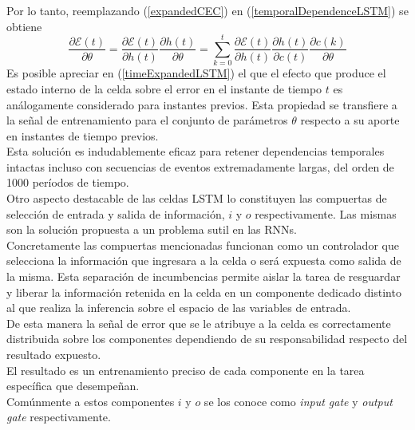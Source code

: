 \documentclass{article}
\begin{document}
	Por lo tanto, reemplazando (\ref{expandedCEC}) en (\ref{temporalDependenceLSTM}) se obtiene
	\begin{equation}\label{timeExpandedLSTM}
	\dfrac{\partial \mathcal{E}(t)}{\partial \theta} = \dfrac{\partial \mathcal{E}(t)}{\partial h(t)} \dfrac{\partial h(t)}{\partial \theta}=\sum_{k=0}^{t} \dfrac{\partial \mathcal{E}(t)}{\partial h(t)} \dfrac{\partial h(t)}{\partial c(t)}\dfrac{\partial c(k)}{\partial \theta}
	\end{equation}
	Es posible apreciar en (\ref{timeExpandedLSTM}) el que el efecto que produce el estado interno de la celda sobre el error en el instante de tiempo $t$ es análogamente considerado para instantes previos. Esta propiedad se transfiere a la señal de entrenamiento para el conjunto de parámetros $\theta$ respecto a su aporte en instantes de tiempo previos.\\
	Esta solución es indudablemente eficaz para retener dependencias temporales intactas incluso con secuencias de eventos extremadamente largas, del orden de 1000 períodos de tiempo.\\
	
	Otro aspecto destacable de las celdas LSTM lo constituyen las compuertas de selección de entrada y salida de información, $i$ y $o$ respectivamente. Las mismas son la solución propuesta a un problema sutil en las RNNs.\\
	Concretamente las compuertas mencionadas funcionan como un controlador que selecciona la información que ingresara a la celda o será expuesta como salida de la misma. Esta separación de incumbencias permite aislar la tarea de resguardar y liberar la información retenida en la celda en un componente dedicado distinto al que realiza la inferencia sobre el espacio de las variables de entrada.\\
	De esta manera la señal de error que se le atribuye a la celda es correctamente distribuida sobre los componentes dependiendo de su responsabilidad respecto del resultado expuesto.\\
	El resultado es un entrenamiento preciso de cada componente en la tarea específica que desempeñan.\\
	Comúnmente a estos componentes $i$ y $o$ se los conoce como \textit{input gate} y \textit{output gate} respectivamente.
	
\end{document}
